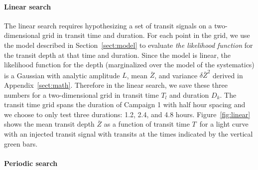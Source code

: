 \documentclass[12pt,preprint]{aastex}
\newcommand{\figref}[1]{\ref{fig:#1}}
\newcommand{\Fig}[1]{Figure~\figref{#1}}
\newcommand{\Sect}[1]{Section~\ref{sect:#1}}
\newcommand{\sect}[1]{\Sect{#1}}
\newcommand{\App}[1]{Appendix~\ref{sect:#1}}
\newcommand{\app}[1]{\App{#1}}
\newcommand{\duration}{{\ensuremath{D}}}
\newcommand{\depth}{{\ensuremath{Z}}}
\newcommand{\transittime}{{\ensuremath{T}}}
\begin{document}
\paragraph{Linear search}

The linear search requires hypothesizing a set of transit signals on a
two-dimensional grid in transit time and duration.
For each point in the grid, we use the model described in \sect{model} to
evaluate \emph{the likelihood function} for the transit depth at that time
and duration.
Since the model is linear, the likelihood function for the depth (marginalized
over the model of the systematics) is a Gaussian with analytic amplitude $L$,
mean $\bar{\depth}$, and variance $\delta\bar{\depth}^2$ derived in
\app{math}.
Therefore in the linear search, we save these three numbers for a
two-dimensional grid in transit time $\transittime_l$ and duration
$\duration_k$.
The transit time grid spans the duration of Campaign 1 with half hour spacing
and we choose to only test three durations: 1.2, 2.4, and 4.8 hours.
\Fig{linear} shows the mean transit depth $\bar{\depth}$ as a function of
transit time \transittime\ for a light curve with an injected transit signal
with transits at the times indicated by the vertical green bars.



\paragraph{Periodic search}
\end{document}
